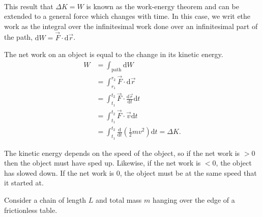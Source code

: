 \documentclass[../newtonian_mechanics.tex]{subfiles}
\begin{document}
        \paragraph{}
        This result that $\Delta K=W$ is known as the work-energy theorem and can be extended to a general force which changes with time.
        In this case, we writ ethe work as the integral over the infinitesimal work done over an infinitesimal part of the path, $\mathrm{d}W=\vec{F}\cdot\mathrm{d}\vec{r}$.
        \begin{theorem}
            The net work on an object is equal to the change in its kinetic energy.
            \begin{align}
                W&=\int_\mathrm{path}\mathrm{d}W\\
                &=\int_{r_1}^{r_2}\vec{F}\cdot\mathrm{d}\vec{r}\\
                &=\int_{t_1}^{t_2}\vec{F}\cdot\frac{\mathrm{d}\vec{r}}{\mathrm{d}t}\mathrm{d}t\\
                &=\int_{t_1}^{t_2}\vec{F}\cdot\vec{v}\mathrm{d}t\\
                &=\int_{t_1}^{t_2}\frac{\mathrm{d}}{\mathrm{d}t}\left(\frac{1}{2}mv^2\right)\mathrm{d}t=\Delta K.
            \end{align}
        \end{theorem}
        The kinetic energy depends on the speed of the object, so if the net work is $>0$ then the object must have sped up.
        Likewise, if the net work is $<0$, the object has slowed down.
        If the net work is 0, the object must be at the same speed that it started at.
        \begin{example}
            Consider a chain of length $L$ and total mass $m$ hanging over the edge of a frictionless table.
        \end{example}
\end{document}
